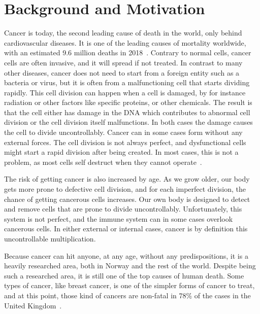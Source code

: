 \section{Background and Motivation}

Cancer is today, the second leading cause of death in the world, only behind cardiovascular diseases. 
It is one of the leading causes of mortality worldwide, with an estimated 9.6 million deaths in 2018~\cite{WHOCANCER}.
Contrary to normal cells, cancer cells are often invasive, and it will spread if not treated. 
In contrast to many other diseases, cancer does not need to start from a foreign entity such as a bacteria or virus, but it is often from a malfunctioning cell that starts dividing rapidly. 
This cell division can happen when a cell is damaged, by for instance radiation or other factors like specific proteins, or other chemicals. The result is that the cell either has damage in the DNA which contributes to abnormal cell division or the cell division itself malfunctions. In both cases the damage causes the cell to divide uncontrollably. 
Cancer can in some cases form without any external forces. The cell division is not always perfect, and dysfunctional cells might start a rapid division after being created. In most cases, this is not a problem, as most cells self destruct when they cannot operate~\cite{selfdestruction,apoptosis}. 

The risk of getting cancer is also increased by age. As we grow older, our body gets more prone to defective cell division, and for each imperfect division, the chance of getting cancerous cells increases.  
Our own body is designed to detect and remove cells that are prone to divide uncontrollably. Unfortunately, this system is not perfect, and the immune system can in some cases overlook cancerous cells.
In either external or internal cases, cancer is by definition this uncontrollable multiplication.




Because cancer can hit anyone, at any age, without any predispositions, it is a heavily researched area, both in Norway and the rest of the world. Despite being such a researched area, it is still one of the top causes of human death. 
Some types of cancer, like breast cancer, is one of the simpler forms of cancer to treat, and at this point, those kind of cancers are non-fatal in 78\% of the cases in the United Kingdom~\cite{UKCancer}. 
    
